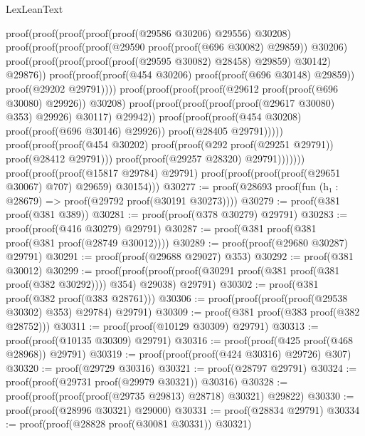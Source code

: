 \begin{lexlean}{LexLeanText}
\begin{coremodule}
                          proof(proof(proof(proof(proof(@29586 @30206) @29556) @30208)
                                proof(proof(proof(proof(@29590 proof(proof(@696 @30082) @29859))
                                        @30206)
                                      proof(proof(proof(proof(proof(@29595 @30082) @28458) @29859)
                                            @30142)
                                          @29876))
                                    proof(proof(proof(@454 @30206) proof(proof(@696 @30148) @29859))
                                        proof(@29202 @29791))))
                              proof(proof(proof(proof(@29612 proof(proof(@696 @30080) @29926))
                                      @30208)
                                    proof(proof(proof(proof(proof(@29617 @30080) @353) @29926)
                                          @30117)
                                        @29942))
                                  proof(proof(proof(@454 @30208) proof(proof(@696 @30146) @29926))
                                      proof(@28405 @29791)))))
                        proof(proof(proof(@454 @30202)
                              proof(proof(@292 proof(@29251 @29791)) proof(@28412 @29791)))
                            proof(proof(@29257 @28320) @29791)))))))
      proof(proof(proof(@15817 @29784) @29791)
          proof(proof(proof(proof(@29651 @30067) @707) @29659) @30154)))
@30277 := proof(@28693 proof(fun (h₁ : @28679) => proof(@29792 proof(@30191 @30273))))
@30279 := proof(@381 proof(@381 @389))
@30281 := proof(proof(@378 @30279) @29791)
@30283 := proof(proof(@416 @30279) @29791)
@30287 := proof(@381 proof(@381 proof(@381 proof(@28749 @30012))))
@30289 := proof(proof(@29680 @30287) @29791)
@30291 := proof(proof(@29688 @29027) @353)
@30292 := proof(@381 @30012)
@30299 := proof(proof(proof(proof(@30291 proof(@381 proof(@381 proof(@382 @30292)))) @354) @29038)
      @29791)
@30302 := proof(@381 proof(@382 proof(@383 @28761)))
@30306 := proof(proof(proof(proof(@29538 @30302) @353) @29784) @29791)
@30309 := proof(@381 proof(@383 proof(@382 @28752)))
@30311 := proof(proof(@10129 @30309) @29791)
@30313 := proof(proof(@10135 @30309) @29791)
@30316 := proof(proof(@425 proof(@468 @28968)) @29791)
@30319 := proof(proof(proof(@424 @30316) @29726) @307)
@30320 := proof(@29729 @30316)
@30321 := proof(@28797 @29791)
@30324 := proof(proof(@29731 proof(@29979 @30321)) @30316)
@30328 := proof(proof(proof(proof(@29735 @29813) @28718) @30321) @29822)
@30330 := proof(proof(@28996 @30321) @29000)
@30331 := proof(@28834 @29791)
@30334 := proof(proof(@28828 proof(@30081 @30331)) @30321)

\end{coremodule}
\end{lexlean}
